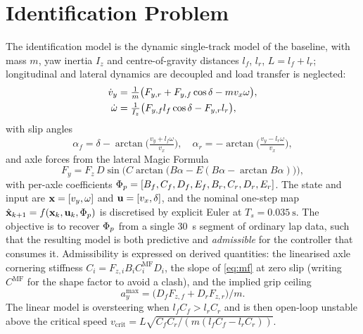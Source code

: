 \section{Identification Problem}
\label{sec:problem}

The identification model is the dynamic single-track model of the baseline,
with mass $m$, yaw inertia $I_{z}$ and centre-of-gravity distances $l_{f}$,
$l_{r}$, $L=l_{f}+l_{r}$; longitudinal and lateral dynamics are decoupled and
load transfer is neglected:
\begin{align}
\dot v_{y} &= \tfrac{1}{m}\big(F_{y,r}+F_{y,f}\cos\delta - m v_{x}\omega\big),\label{eq:vydot}\\
\dot\omega &= \tfrac{1}{I_{z}}\big(F_{y,f} l_{f}\cos\delta - F_{y,r} l_{r}\big),\label{eq:omdot}
\end{align}
with slip angles
\begin{equation}
\alpha_{f}=\delta-\arctan\!\Big(\tfrac{v_{y}+l_{f}\omega}{v_{x}}\Big),\quad
\alpha_{r}=-\arctan\!\Big(\tfrac{v_{y}-l_{r}\omega}{v_{x}}\Big),
\label{eq:slip}
\end{equation}
and axle forces from the lateral Magic Formula
\begin{equation}
F_{y}=F_{z}\,D\sin\!\big(C\arctan\!\big(B\alpha-E(B\alpha-\arctan B\alpha)\big)\big),
\label{eq:mf}
\end{equation}
with per-axle coefficients
$\Phi_{p}=[B_{f},C_{f},D_{f},E_{f},B_{r},C_{r},D_{r},E_{r}]$. The state and input
are $\mathbf{x}=[v_{y},\omega]$ and $\mathbf{u}=[v_{x},\delta]$, and the nominal one-step
map $\hat{\mathbf{x}}_{k+1}=f(\mathbf{x}_{k},\mathbf{u}_{k},\Phi_{p})$ is discretised by explicit
Euler at $T_{s}=\SI{0.035}{\second}$. The objective is to recover $\Phi_{p}$ from
a single \SI{30}{\second} segment of ordinary lap data, such that the resulting
model is both predictive and \emph{admissible} for the controller that consumes
it. Admissibility is expressed on derived quantities:
the linearised axle cornering stiffness
$C_{i}=F_{z,i}B_{i}C_{i}^{\mathrm{MF}}D_{i}$, the slope of \eqref{eq:mf} at
zero slip (writing $C^{\mathrm{MF}}$ for the shape factor to avoid a clash),
and the implied grip ceiling
\begin{equation}
a_{y}^{\max}=\big(D_{f}F_{z,f}+D_{r}F_{z,r}\big)/m.
\label{eq:gripceiling}
\end{equation}
The linear model is oversteering when $l_{f}C_{f}>l_{r}C_{r}$ and is then
open-loop unstable above the critical speed
$v_{\mathrm{crit}}=L\sqrt{C_{f}C_{r}/(m(l_{f}C_{f}-l_{r}C_{r}))}$.

